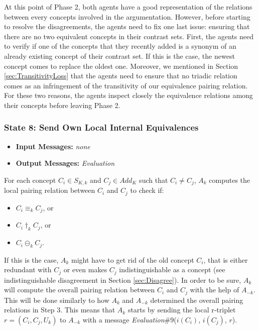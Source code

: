 At this point of Phase 2, both agents have a good representation of the relations between every concepts involved in the argumentation. However, before starting to resolve the disagreements, the agents need to fix one last issue: ensuring that there are no two equivalent concepts in their contrast sets. First, the agents need to verify if one of the concepts that they recently added is a synonym of an already existing concept of their contrast set. If this is the case, the newest concept comes to replace the oldest one. Moreover, we mentioned in Section \ref{sec:TransitivityLoss} that the agents need to ensure that no triadic relation comes as an infringement of the transitivity of our equivalence pairing relation. For these two reasons, the agents inspect closely the equivalence relations among their concepts before leaving Phase 2.

\subsubsection{State 8: Send Own Local Internal Equivalences}

\begin{itemize}
    \item \textbf{Input Messages:} \emph{none}
    \item \textbf{Output Messages:} \emph{Evaluation}
\end{itemize}

For each concept $C_{i} \in S_{K,k}$ and $C_{j} \in Add_{K}$ such that $C_{i} \neq C_{j}$, $A_{k}$ computes the local pairing relation between $C_{i}$ and $C_{j}$ to check if:

\begin{itemize}
    \item $C_{i} \equiv_{k} C_{j}$, or
    \item $C_{i} \dagger_{k} C_{j}$, or
    \item $C_{i} \circleddash_{k} C_{j}$.
\end{itemize}

If this is the case, $A_{k}$ might have to get rid of the old concept $C_{i}$, that is either redundant with $C_{j}$ or even makes $C_{j}$ indistinguishable as a concept (see indistinguishable disagreement in Section \ref{sec:Disagree}). In order to be sure, $A_{k}$ will compute the overall pairing relation between $C_{i}$ and $C_{j}$ with the help of $A_{-k}$. This will be done similarly to how $A_{k}$ and $A_{-k}$ determined the overall pairing relations in Step 3. This means that $A_{k}$ starts by sending the local r-triplet $r = (C_{i}, C_{j}, U_{k})$ to $A_{-k}$ with a message \emph{Evaluation}\#9($i(C_{i})$, $i(C_{j})$, $r$).

